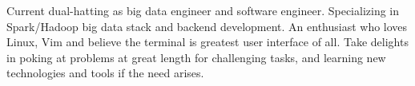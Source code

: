 

\begin{cvparagraph}

Current dual-hatting as big data engineer and software engineer. Specializing in
    Spark/Hadoop big data stack and backend development. An enthusiast who loves
    Linux, Vim and believe the terminal is greatest user interface of all.
    Take delights in poking at problems at great length for challenging tasks,
    and learning new technologies and tools if the need arises.
\end{cvparagraph}
